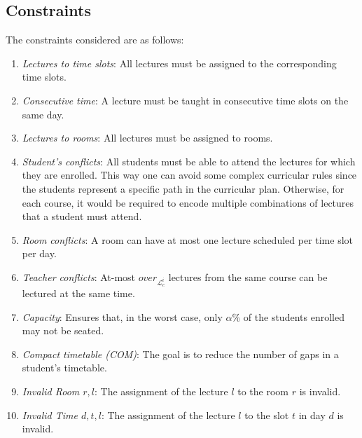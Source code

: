 \documentclass[runningheads]{llncs}
\begin{document}
\subsection{Constraints}

The constraints considered are as follows:
\begin{enumerate}
\item 
{\em Lectures to time slots}: All lectures must be assigned to the corresponding time slots.
\item {\em Consecutive time}: A lecture must be taught in consecutive time slots on the same day. 
\item {\em Lectures to rooms}: All lectures must be assigned to rooms.
\item {\em Student's conflicts}: All students must be able to attend the lectures for which they are enrolled. This way one can avoid some complex curricular rules since the students represent a specific path in the curricular plan. Otherwise, for each course, it would be required to encode multiple combinations of lectures that a student must attend. 
\item {\em Room conflicts}: A room can have at most one lecture scheduled per time slot per day.
\item {\em Teacher conflicts}: At-most $over_{\mathcal{L}_c^{i}}$ lectures from the same course can be lectured at the same time. 
\item {\em Capacity}: Ensures that, in the worst case, only $\alpha$\% of the students enrolled may not be seated. %
\item {\em Compact timetable (COM)}: The goal is to reduce the number of gaps in a student's timetable.
\item {\em Invalid Room $r,l$}: The assignment of the lecture $l$ to the room $r$ is invalid.
\item {\em Invalid Time $d,t,l$}: The assignment of the lecture $l$ to the slot $t$ in day $d$ is invalid.

\end{enumerate}
\end{document}
